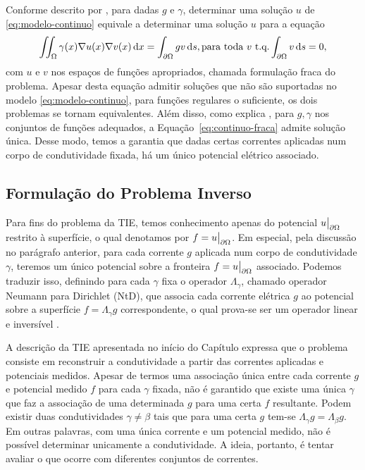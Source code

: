 Conforme descrito por \cite{santana}, para dadas $g$ e $\gamma$, determinar uma solução $u$ de \ref{eq:modelo-continuo} equivale a determinar uma solução $u$ para a equação
\begin{equation}\label{eq:continuo-fraca}
    \iint_{\Omega}\gamma(x)\nabla u(x) \nabla v(x) \mathop{}\!\mathrm{d} x = \int_{\partial \Omega} gv \mathop{}\!\mathrm{d} s, \text{para toda $v$ t.q.} \int_{\partial \Omega} v \mathop{}\!\mathrm{d} s = 0,
\end{equation}
com $u$ e $v$ nos espaços de funções apropriados, chamada formulação fraca do problema. Apesar desta equação admitir soluções que não são suportadas no modelo \eqref{eq:modelo-continuo}, para funções regulares o suficiente, os dois problemas se tornam equivalentes. Além disso, como explica , para $g,\gamma$ nos conjuntos de funções adequados, a Equação~\eqref{eq:continuo-fraca} admite solução única. Desse modo, temos a garantia que dadas certas correntes aplicadas num corpo de condutividade fixada, há um único potencial elétrico associado.

\subsection{Formulação do Problema Inverso}

Para fins do problema da TIE, temos conhecimento apenas do potencial $u\big |_{\partial \Omega}$ restrito à superfície, o qual denotamos por $f=u \big |_{\partial \Omega}$. Em especial, pela discussão no parágrafo anterior, para cada corrente $g$ aplicada num corpo de condutividade $\gamma$, teremos um único potencial sobre a fronteira $f=u\big |_{\partial \Omega}$ associado. Podemos traduzir isso, definindo para cada $\gamma$ fixa o operador $\Lambda_\gamma$, chamado operador Neumann para Dirichlet (NtD), que associa cada corrente elétrica $g$ ao potencial sobre a superfície $f=\Lambda_\gamma g$ correspondente, o qual prova-se ser um operador linear e inversível \cite{margotti}.


A descrição da TIE apresentada no início do Capítulo expressa que o problema consiste em reconstruir a condutividade a partir das correntes aplicadas e potenciais medidos. Apesar de termos uma associação única entre cada corrente $g$ e potencial medido $f$ para cada $\gamma$ fixada, não é garantido que existe uma única $\gamma$ que faz a associação de uma determinada $g$ para uma certa $f$ resultante. Podem existir duas condutividades $\gamma \neq \beta$ tais que para uma certa $g$ tem-se $\Lambda_\gamma g = \Lambda_{\beta} g$.  Em outras palavras, com uma única corrente e um potencial medido, não é possível determinar unicamente a condutividade. A ideia, portanto, é tentar avaliar o que ocorre com diferentes conjuntos de correntes.

